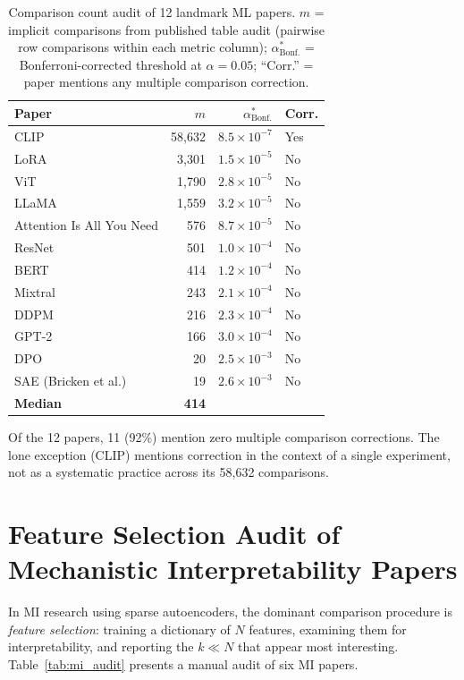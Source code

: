 \documentclass{article}
\begin{document}
\begin{table}[h]
\centering
\caption{Comparison count audit of 12 landmark ML papers. $m$ = implicit comparisons from published table audit (pairwise row comparisons within each metric column); $\alpha^*_{\text{Bonf.}}$ = Bonferroni-corrected threshold at $\alpha = 0.05$; ``Corr.'' = paper mentions any multiple comparison correction.}
\label{tab:fwer_audit}
\small
\begin{tabular}{@{}lrrl@{}}
\toprule
Paper & $m$ & $\alpha^*_{\text{Bonf.}}$ & Corr. \\
\midrule
CLIP & 58{,}632 & $8.5 \times 10^{-7}$ & Yes \\
LoRA & 3{,}301 & $1.5 \times 10^{-5}$ & No \\
ViT & 1{,}790 & $2.8 \times 10^{-5}$ & No \\
LLaMA & 1{,}559 & $3.2 \times 10^{-5}$ & No \\
Attention Is All You Need & 576 & $8.7 \times 10^{-5}$ & No \\
ResNet & 501 & $1.0 \times 10^{-4}$ & No \\
BERT & 414 & $1.2 \times 10^{-4}$ & No \\
Mixtral & 243 & $2.1 \times 10^{-4}$ & No \\
DDPM & 216 & $2.3 \times 10^{-4}$ & No \\
GPT-2 & 166 & $3.0 \times 10^{-4}$ & No \\
DPO & 20 & $2.5 \times 10^{-3}$ & No \\
SAE (Bricken et al.) & 19 & $2.6 \times 10^{-3}$ & No \\
\midrule
\textbf{Median} & \textbf{414} & & \\
\bottomrule
\end{tabular}
\end{table}

Of the 12 papers, 11 (92\%) mention zero multiple comparison corrections. The lone exception (CLIP) mentions correction in the context of a single experiment, not as a systematic practice across its 58,632 comparisons.

\section{Feature Selection Audit of Mechanistic Interpretability Papers}
\label{app:mi_audit}

In MI research using sparse autoencoders, the dominant comparison procedure is \textit{feature selection}: training a dictionary of $N$ features, examining them for interpretability, and reporting the $k \ll N$ that appear most interesting. Table~\ref{tab:mi_audit} presents a manual audit of six MI papers.
\end{document}
